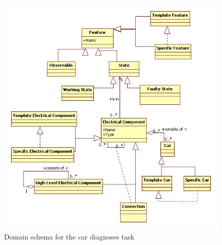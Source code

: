 \begin{figure}[htbp]
	\centering
		\includegraphics[width=1.00\textwidth]{DomainSchema.jpg}
	\caption{Domain schema for the car diagnoses task}
	\label{fig:DS}
\end{figure}

